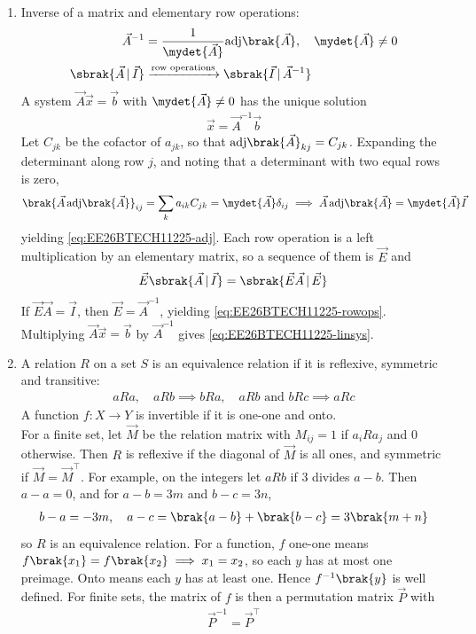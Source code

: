 \begin{enumerate}[label=\thesubsection.\arabic*, ref=\thesubsection.\theenumi]
\item Inverse of a matrix and elementary row operations:
\begin{align}
	\vec{A}^{-1} &= \frac{1}{\mydet{\vec{A}}}\text{adj}\brak{\vec{A}}, \quad \mydet{\vec{A}} \neq 0
	\label{eq:EE26BTECH11225-adj}
	\\
	\sbrak{\vec{A} \,|\, \vec{I}} &\xrightarrow{\text{row operations}} \sbrak{\vec{I} \,|\, \vec{A}^{-1}}
	\label{eq:EE26BTECH11225-rowops}
\end{align}
A system $\vec{A}\vec{x} = \vec{b}$ with $\mydet{\vec{A}} \neq 0$ has the unique solution
\begin{align}
	\vec{x} = \vec{A}^{-1}\vec{b}
	\label{eq:EE26BTECH11225-linsys}
\end{align}
\solution
Let $C_{jk}$ be the cofactor of $a_{jk}$, so that $\text{adj}\brak{\vec{A}}_{kj} = C_{jk}$. Expanding the determinant along row $j$, and noting that a determinant with two equal rows is zero,
\begin{align}
	\brak{\vec{A}\,\text{adj}\brak{\vec{A}}}_{ij} = \sum_{k} a_{ik}C_{jk} = \mydet{\vec{A}}\delta_{ij}
	\implies \vec{A}\,\text{adj}\brak{\vec{A}} = \mydet{\vec{A}}\vec{I}
\end{align}
yielding \eqref{eq:EE26BTECH11225-adj}. Each row operation is a left multiplication by an elementary matrix, so a sequence of them is $\vec{E}$ and
\begin{align}
	\vec{E}\sbrak{\vec{A} \,|\, \vec{I}} = \sbrak{\vec{E}\vec{A} \,|\, \vec{E}}
\end{align}
If $\vec{E}\vec{A} = \vec{I}$, then $\vec{E} = \vec{A}^{-1}$, yielding \eqref{eq:EE26BTECH11225-rowops}. Multiplying $\vec{A}\vec{x} = \vec{b}$ by $\vec{A}^{-1}$ gives \eqref{eq:EE26BTECH11225-linsys}.

\item A relation $R$ on a set $S$ is an equivalence relation if it is reflexive, symmetric and transitive:
\begin{align}
	aRa, \quad aRb \implies bRa, \quad aRb \text{ and } bRc \implies aRc
	\label{eq:EE26BTECH11225-equiv}
\end{align}
A function $f: X \to Y$ is invertible if it is one-one and onto.
\\
\solution
For a finite set, let $\vec{M}$ be the relation matrix with $M_{ij} = 1$ if $a_i R a_j$ and $0$ otherwise. Then $R$ is reflexive if the diagonal of $\vec{M}$ is all ones, and symmetric if $\vec{M} = \vec{M}^{\top}$. For example, on the integers let $aRb$ if $3$ divides $a - b$. Then $a - a = 0$, and for $a - b = 3m$ and $b - c = 3n$,
\begin{align}
	b - a = -3m, \quad a - c = \brak{a - b} + \brak{b - c} = 3\brak{m + n}
\end{align}
so $R$ is an equivalence relation. For a function, $f$ one-one means $f\brak{x_1} = f\brak{x_2} \implies x_1 = x_2$, so each $y$ has at most one preimage. Onto means each $y$ has at least one. Hence $f^{-1}\brak{y}$ is well defined. For finite sets, the matrix of $f$ is then a permutation matrix $\vec{P}$ with
\begin{align}
	\vec{P}^{-1} = \vec{P}^{\top}
\end{align}


\end{enumerate}
